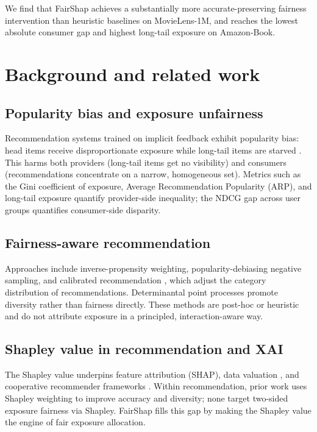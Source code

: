 \documentclass[pdflatex,sn-mathphys-num]{sn-jnl}%
\theoremstyle{thmstyleone}%
\theoremstyle{thmstyletwo}%
\theoremstyle{thmstylethree}%
\begin{document}
We find that FairShap achieves a substantially more accurate-preserving fairness intervention than heuristic baselines on MovieLens-1M, and reaches the lowest absolute consumer gap and highest long-tail exposure on Amazon-Book.

\section{Background and related work}\label{sec2}

\subsection{Popularity bias and exposure unfairness}
Recommendation systems trained on implicit feedback exhibit popularity bias: head items receive disproportionate exposure while long-tail items are starved \cite{abdollahpouri2019popularity}. This harms both providers (long-tail items get no visibility) and consumers (recommendations concentrate on a narrow, homogeneous set). Metrics such as the Gini coefficient of exposure, Average Recommendation Popularity (ARP), and long-tail exposure quantify provider-side inequality; the NDCG gap across user groups quantifies consumer-side disparity.

\subsection{Fairness-aware recommendation}
Approaches include inverse-propensity weighting, popularity-debiasing negative sampling, and calibrated recommendation \cite{steck2018calibrated}, which adjust the category distribution of recommendations. Determinantal point processes \cite{li2017dpp} promote diversity rather than fairness directly. These methods are post-hoc or heuristic and do not attribute exposure in a principled, interaction-aware way.

\subsection{Shapley value in recommendation and XAI}
The Shapley value \cite{shapley1953} underpins feature attribution (SHAP), data valuation \cite{ghorbani2019datashapley}, and cooperative recommender frameworks \cite{louhichi2026dyhucog}. Within recommendation, prior work uses Shapley weighting to improve accuracy and diversity; none target two-sided exposure fairness via Shapley. FairShap fills this gap by making the Shapley value the engine of fair exposure allocation.
\end{document}

